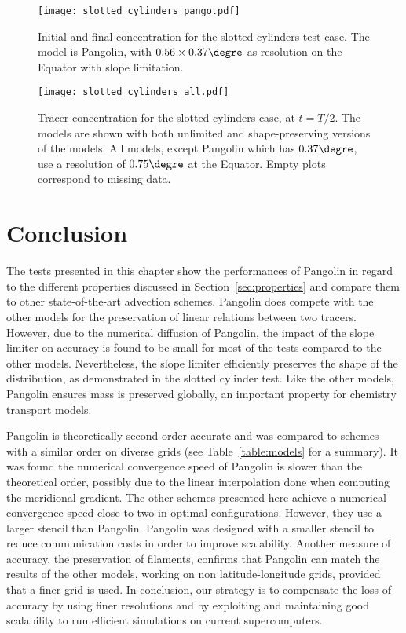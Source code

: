 \begin{figure}
  \centerline{%
    \texttt{[image: slotted\_cylinders\_pango.pdf]}%
  }
 \caption{Initial and final concentration for the slotted cylinders test
  case. The model is Pangolin, with $0.56\times0.37\degre$ as resolution on the
  Equator with slope limitation.}
  \label{fig:slotted}
\end{figure}

\begin{figure}
  \centering
  \texttt{[image: slotted\_cylinders\_all.pdf]}
  \caption{Tracer concentration for the slotted cylinders case, at $t=T/2$. The
    models are shown with both unlimited and shape-preserving versions of the
    models. All models, except Pangolin which has $0.37\degre$, use a resolution
  of $0.75\degre$ at the Equator. Empty plots correspond to missing data.}
  \label{fig:slotted_comp}
\end{figure}

\section{Conclusion}
The tests presented in this chapter show the performances of Pangolin in regard
to the different properties discussed in Section~\ref{sec:properties} and
compare them to other state-of-the-art advection schemes. Pangolin does compete
with the other models for the preservation of linear relations between two
tracers. However, due to the numerical diffusion of Pangolin, the impact of the slope
limiter on accuracy is found to be small for most of the tests compared to the other
models. Nevertheless, the slope limiter efficiently preserves the shape of the
distribution, as demonstrated in the slotted cylinder test. Like the other
models, Pangolin ensures mass is preserved globally, an important property for
chemistry transport models. 

Pangolin is theoretically second-order accurate and was compared to
schemes with a similar order on diverse grids (see Table~\ref{table:models} for
a summary). It was found the numerical convergence speed of Pangolin is slower than the
theoretical order, possibly due to the linear interpolation done when computing
the meridional gradient. The other schemes presented here achieve a numerical
convergence speed close to two in optimal configurations. However, they use a
larger stencil than Pangolin. Pangolin was designed with a smaller stencil to
reduce communication costs in order to improve scalability. Another measure of
accuracy, the preservation of filaments, confirms that Pangolin can match the
results of the other models, working on non latitude-longitude grids, provided
that a finer grid is used. In conclusion, our strategy is to compensate the loss
of accuracy by using finer resolutions and by exploiting and maintaining good
scalability to run efficient simulations on current supercomputers.
